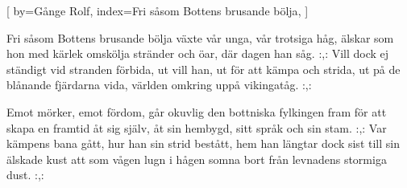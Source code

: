 

[
by={Gånge Rolf},
index={Fri såsom Bottens brusande bölja},
]

\beginverse*
Fri såsom Bottens brusande bölja
växte vår unga, vår trotsiga håg,
älskar som hon med kärlek omskölja
stränder och öar, där dagen han såg.
:,: Vill dock ej ständigt vid stranden förbida,
ut vill han, ut för att kämpa och strida,
ut på de blånande fjärdarna vida,
världen omkring uppå vikingatåg. :,:
\endverse

\beginverse* 
Emot mörker, emot fördom, går okuvlig den
bottniska fylkingen fram
för att skapa en framtid åt sig själv, åt sin hembygd,
sitt språk och sin stam. 
:,: Var kämpens bana gått, 
hur han sin strid bestått,
hem han längtar dock sist till sin älskade kust
att som vågen lugn i hågen somna bort från
levnadens stormiga dust. :,:
\endverse
\endsong


